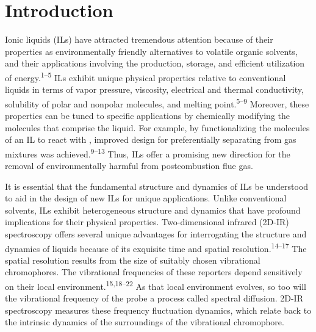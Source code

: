 \section{Introduction}
\label{paper_03:sec:I}

Ionic liquids (ILs) have attracted tremendous attention because of their properties as environmentally friendly alternatives to volatile organic solvents, and their applications involving the production, storage, and efficient utilization of energy.\textsuperscript{1--5} ILs exhibit unique physical properties relative to conventional liquids in terms of vapor pressure, viscosity, electrical and thermal conductivity, solubility of polar and nonpolar molecules, and melting point.\textsuperscript{5--9} Moreover, these properties can be tuned to specific applications by chemically modifying the molecules that comprise the liquid. For example, by functionalizing the molecules of an IL to react with , improved design for preferentially separating  from gas mixtures was achieved.\textsuperscript{9--13} Thus, ILs offer a promising new direction for the removal of environmentally harmful  from postcombustion flue gas.

It is essential that the fundamental structure and dynamics of ILs be understood to aid in the design of new ILs for unique applications.  Unlike conventional solvents, ILs exhibit heterogeneous structure and dynamics that have profound implications for their physical properties.  Two-dimensional infrared (2D-IR) spectroscopy offers several unique advantages for interrogating the structure and dynamics of liquids because of its exquisite time and spatial resolution.\textsuperscript{14--17} The spatial resolution results from the size of suitably chosen vibrational chromophores. The vibrational frequencies of these reporters depend sensitively on their local environment.\textsuperscript{15,18--22} As that local environment evolves, so too will the vibrational frequency of the probe \textemdash{} a process called spectral diffusion. 2D-IR spectroscopy measures these frequency fluctuation dynamics, which relate back to the intrinsic dynamics of the surroundings of the vibrational chromophore.

